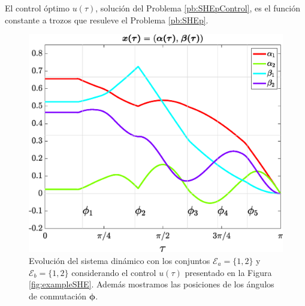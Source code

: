 \begin{theorem}
    El control óptimo $u(\tau)$, solución del Problema \ref{pb:SHEpControl}, es el función constante a trozos que resuleve el Problema \ref{pb:SHEp}.   
\end{theorem}

\begin{figure}[ht!] 
    \centering
    \includegraphics[scale=0.35]{img/fig02.eps}
    \caption{Evolución del sistema dinámico con los conjuntos $\mathcal{E}_a = \{1,2\}$ y $\mathcal{E}_b = \{1,2\}$ considerando el control $u(\tau)$ presentado en la Figura \ref{fig:exampleSHE}. Además mostramos las posiciones de los ángulos de conmutación $\bm{\phi}$.}
\end{figure}


